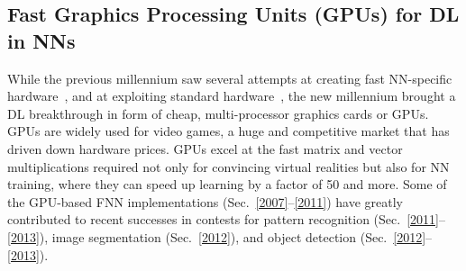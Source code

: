 \documentclass[letterpaper]{article}
\begin{document}
\begin{CJK*}{UTF8}{gbsn}
\subsection{Fast Graphics Processing Units (GPUs) for DL in NNs}
\label{gpu}

While the previous millennium saw several attempts at creating fast NN-specific hardware~\citep[e.g.,][]{jackel-90,faggin92,ramacher93,widrow94,heemskerk1995,cbm97,urlbe1999},
and at exploiting standard hardware~\citep[e.g.,][]{anguita1994,muller1995,anguita1996},
the new millennium brought a DL breakthrough in form of cheap, multi-processor
graphics cards or GPUs. GPUs are widely used for video games, a huge and competitive market
that has driven down hardware prices.
GPUs excel at the fast matrix and vector multiplications required not only for 
convincing virtual realities but also for NN training, 
where they can speed up learning by a factor of  50 and more.
Some of the GPU-based FNN implementations (Sec.~\ref{2007}--\ref{2011}) have greatly contributed to recent successes in contests for pattern recognition (Sec.~\ref{2011}--\ref{2013}),
image segmentation (Sec.~\ref{2012}),
and object detection (Sec.~\ref{2012}--\ref{2013}).
 




%
%
%
%
%
\end{CJK*}
\end{document}
